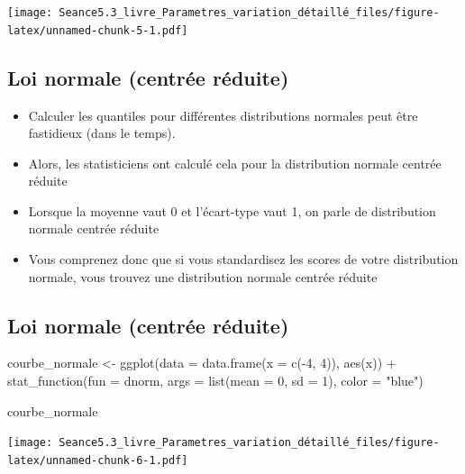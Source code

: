 \documentclass[
]{article}
\newenvironment{Shaded}{\begin{snugshade}}{\end{snugshade}}
\newcommand{\AttributeTok}[1]{\textcolor[rgb]{0.77,0.63,0.00}{#1}}
\newcommand{\DecValTok}[1]{\textcolor[rgb]{0.00,0.00,0.81}{#1}}
\newcommand{\FunctionTok}[1]{\textcolor[rgb]{0.00,0.00,0.00}{#1}}
\newcommand{\NormalTok}[1]{#1}
\newcommand{\OtherTok}[1]{\textcolor[rgb]{0.56,0.35,0.01}{#1}}
\newcommand{\SpecialCharTok}[1]{\textcolor[rgb]{0.00,0.00,0.00}{#1}}
\newcommand{\StringTok}[1]{\textcolor[rgb]{0.31,0.60,0.02}{#1}}
\providecommand{\tightlist}{%
  \setlength{\itemsep}{0pt}\setlength{\parskip}{0pt}}
\begin{document}
\texttt{[image: Seance5.3\_livre\_Parametres\_variation\_détaillé\_files/figure-latex/unnamed-chunk-5-1.pdf]}

\hypertarget{loi-normale-centruxe9e-ruxe9duite}{%
\subsection{Loi normale (centrée
réduite)}\label{loi-normale-centruxe9e-ruxe9duite}}

\begin{itemize}
\tightlist
\item
  Calculer les quantiles pour différentes distributions normales peut
  être fastidieux (dans le temps).
\item
  Alors, les statisticiens ont calculé cela pour la distribution normale
  centrée réduite
\item
  Lorsque la moyenne vaut 0 et l'écart-type vaut 1, on parle de
  distribution normale centrée réduite
\item
  Vous comprenez donc que si vous standardisez les scores de votre
  distribution normale, vous trouvez une distribution normale centrée
  réduite
\end{itemize}

\hypertarget{loi-normale-centruxe9e-ruxe9duite-1}{%
\subsection{Loi normale (centrée
réduite)}\label{loi-normale-centruxe9e-ruxe9duite-1}}

\begin{Shaded}
\begin{Highlighting}[]
\NormalTok{courbe\_normale }\OtherTok{\textless{}{-}} 
  \FunctionTok{ggplot}\NormalTok{(}\AttributeTok{data =} \FunctionTok{data.frame}\NormalTok{(}\AttributeTok{x =} \FunctionTok{c}\NormalTok{(}\SpecialCharTok{{-}}\DecValTok{4}\NormalTok{, }\DecValTok{4}\NormalTok{)), }\FunctionTok{aes}\NormalTok{(x)) }\SpecialCharTok{+}
  \FunctionTok{stat\_function}\NormalTok{(}\AttributeTok{fun =}\NormalTok{ dnorm, }\AttributeTok{args =} \FunctionTok{list}\NormalTok{(}\AttributeTok{mean =} \DecValTok{0}\NormalTok{, }\AttributeTok{sd =} \DecValTok{1}\NormalTok{), }\AttributeTok{color =} \StringTok{"blue"}\NormalTok{) }

\NormalTok{courbe\_normale}
\end{Highlighting}
\end{Shaded}

\texttt{[image: Seance5.3\_livre\_Parametres\_variation\_détaillé\_files/figure-latex/unnamed-chunk-6-1.pdf]}
\end{document}
